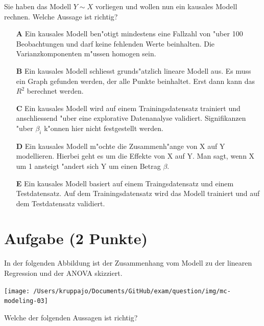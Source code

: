 \documentclass[a4paper, 10pt]{scrartcl}\usepackage[]{graphicx}\usepackage[]{xcolor}
\begin{document}
Sie haben das Modell $Y \sim X$ vorliegen und wollen nun ein
kausales Modell rechnen. Welche Aussage ist richtig?



\begin{enumerate}
\item [\textbf{A} \msquare] Ein kausales Modell ben{"o}tigt mindestens eine Fallzahl von {"u}ber 100 Beobachtungen und darf keine fehlenden Werte beinhalten. Die Varianzkomponenten m{"u}ssen homogen sein.
\item [\textbf{B} \msquare] Ein kausales Modell schliesst grunds{"a}tzlich lineare Modell aus. Es muss ein Graph gefunden werden, der alle Punkte beinhaltet. Erst dann kann das $R^2$ berechnet werden.
\item [\textbf{C} \msquare] Ein kausales Modell wird auf einem Trainingsdatensatz trainiert und anschliessend {"u}ber eine explorative Datenanalyse validiert. Signifikanzen {"u}ber $\beta_i$ k{"o}nnen hier nicht festgestellt werden.
\item [\textbf{D} \msquare] Ein kausales Modell m{"o}chte die Zusammenh{"a}nge von X auf Y modellieren. Hierbei geht es um die Effekte von X auf Y. Man sagt, wenn X um 1 ansteigt {"a}ndert sich Y um einen Betrag $\beta$.
\item [\textbf{E} \msquare] Ein kausales Modell basiert auf einem Traingsdatensatz und einem Testdatensatz. Auf dem Trainingsdatensatz wird das Modell trainiert und auf dem Testdatensatz validiert.
\end{enumerate}

\section{Aufgabe \hfill (2 Punkte)}



In der folgenden Abbildung ist der Zusammenhang vom Modell zu der linearen
Regression und der ANOVA skizziert.

\begin{center}
  \texttt{[image: /Users/kruppajo/Documents/GitHub/exam/question/img/mc-modeling-03]}
\end{center}

Welche der folgenden Aussagen ist richtig?
\end{document}
